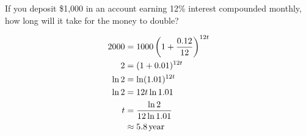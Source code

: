 \documentclass[fleqn,addpoints]{exam}
\begin{document}
\begin{questions}

    \question[7]
      If you deposit \$1,000 in an account earning 12\% interest compounded monthly, how long will it take for the money
      to double?

      \begin{solution}
        \begin{align*}
          2000  & = 1000 \left( 1 + \frac{0.12}{12} \right)^{12t} \\
          2     & = ( 1 + 0.01 )^{12t} \\
          \ln 2 & = \ln (1.01)^{12t} \\
          \ln 2 & = 12 t \ln 1.01 \\
          t     & = \frac{\ln 2}{12 \ln 1.01 } \\
                & \approx \unit[5.8]{year} \\
        \end{align*}
      \end{solution}


\end{questions}
\end{document}
